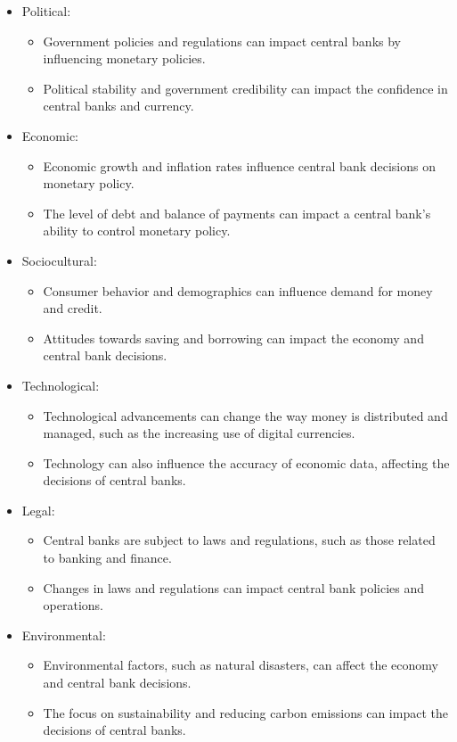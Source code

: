 \begin{itemize}
\item Political:
\begin{itemize}
\item Government policies and regulations can impact central banks by influencing monetary policies.
\item Political stability and government credibility can impact the confidence in central banks and currency.
\end{itemize}
\item Economic:
\begin{itemize}
\item Economic growth and inflation rates influence central bank decisions on monetary policy.
\item The level of debt and balance of payments can impact a central bank's ability to control monetary policy.
\end{itemize}
\item Sociocultural:
\begin{itemize}
\item Consumer behavior and demographics can influence demand for money and credit.
\item Attitudes towards saving and borrowing can impact the economy and central bank decisions.
\end{itemize}
\item Technological:
\begin{itemize}
\item Technological advancements can change the way money is distributed and managed, such as the increasing use of digital currencies.
\item Technology can also influence the accuracy of economic data, affecting the decisions of central banks.
\end{itemize}
\item Legal:
\begin{itemize}
\item Central banks are subject to laws and regulations, such as those related to banking and finance.
\item Changes in laws and regulations can impact central bank policies and operations.
\end{itemize}
\item Environmental:
\begin{itemize}
\item Environmental factors, such as natural disasters, can affect the economy and central bank decisions.
\item The focus on sustainability and reducing carbon emissions can impact the decisions of central banks.
\end{itemize}
\end{itemize}

